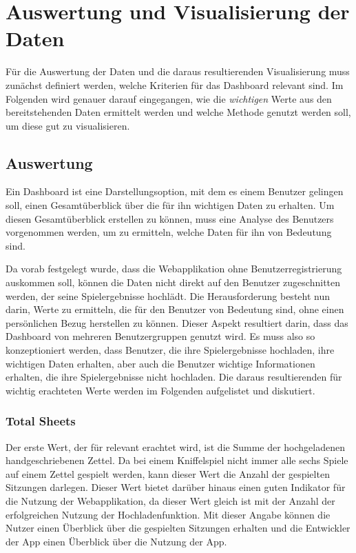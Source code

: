 \section{Auswertung und Visualisierung der Daten}
Für die Auswertung der Daten und die daraus resultierenden Visualisierung muss zunächst definiert werden, welche Kriterien für das Dashboard relevant sind. Im Folgenden wird genauer darauf eingegangen, wie die \textit{wichtigen} Werte aus den bereitstehenden Daten ermittelt werden und welche Methode genutzt werden soll, um diese gut zu visualisieren.

\subsection{Auswertung}
Ein Dashboard ist eine Darstellungsoption, mit dem es einem Benutzer gelingen soll, einen Gesamtüberblick über die für ihn wichtigen Daten zu erhalten. Um diesen Gesamtüberblick erstellen zu können, muss eine Analyse des Benutzers vorgenommen werden, um zu ermitteln, welche Daten für ihn von Bedeutung sind. \cite{few_2013}

Da vorab festgelegt wurde, dass die Webapplikation ohne Benutzerregistrierung auskommen soll, können die Daten nicht direkt auf den Benutzer zugeschnitten werden, der seine Spielergebnisse hochlädt. Die Herausforderung besteht nun darin, Werte zu ermitteln, die für den Benutzer von Bedeutung sind, ohne einen persönlichen Bezug herstellen zu können. Dieser Aspekt resultiert darin, dass das Dashboard von mehreren Benutzergruppen genutzt wird. Es muss also so konzeptioniert werden, dass Benutzer, die ihre Spielergebnisse hochladen, ihre wichtigen Daten erhalten, aber auch die Benutzer wichtige Informationen erhalten, die ihre Spielergebnisse nicht hochladen. Die daraus resultierenden für wichtig erachteten Werte werden im Folgenden aufgelistet und diskutiert.

\subsubsection{Total Sheets}
Der erste Wert, der für relevant erachtet wird, ist die Summe der hochgeladenen handgeschriebenen Zettel. Da bei einem Kniffelspiel nicht immer alle sechs Spiele auf einem Zettel gespielt werden, kann dieser Wert die Anzahl der gespielten Sitzungen darlegen. Dieser Wert bietet darüber hinaus einen guten Indikator für die Nutzung der Webapplikation, da dieser Wert gleich ist mit der Anzahl der erfolgreichen Nutzung der Hochladenfunktion. Mit dieser Angabe können die Nutzer einen Überblick über die gespielten Sitzungen erhalten und die Entwickler der App einen Überblick über die Nutzung der App.

